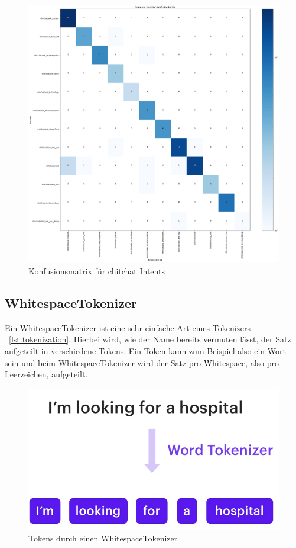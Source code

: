 \begin{figure}[hbt!]
    \centering
    \includegraphics[scale=0.3]{pics/confusion_matrix}
    \caption{Konfusionsmatrix für chitchat Intents}
    \label{fig:confusion_matrix}
\end{figure}

\subsection{WhitespaceTokenizer}\label{subsec:whitespace-tokenizer}

Ein WhitespaceTokenizer ist eine sehr einfache Art eines Tokenizers ~\ref{lst:tokenization}.
Hierbei wird, wie der Name bereits vermuten lässt, der Satz aufgeteilt in verschiedene Tokens.
Ein Token kann zum Beispiel also ein Wort sein und beim WhitespaceTokenizer wird der Satz pro Whitespace, also pro Leerzeichen, aufgeteilt.\cite{whitespaceTokenizer, rasaMasterclassWhitespaceTokenizer, pipelineComponentsYoutube}

\begin{figure}[hbt!]
    \centering
    \includegraphics[scale=0.25]{pics/whitespacetokenizer}
    \caption{Tokens durch einen WhitespaceTokenizer~\cite{pipelineComponentsYoutube}}
    \label{fig:WhitespaceTokenizer}
\end{figure}

